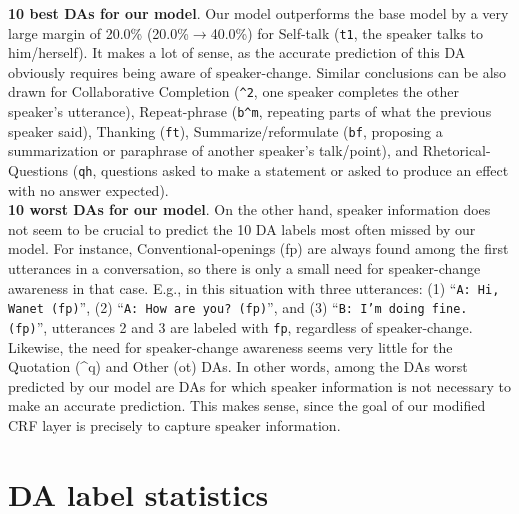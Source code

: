 \documentclass[11pt,a4paper]{article}
\begin{document}
\noindent \textbf{10 best DAs for our model}.
Our model outperforms the base model by a very large margin of 20.0\% (20.0\%$\rightarrow$40.0\%) for Self-talk (\texttt{t1}, the speaker talks to him/herself).
It makes a lot of sense, as the accurate prediction of this DA obviously requires being aware of speaker-change.
Similar conclusions can be also drawn for Collaborative Completion (\texttt{\^{}2}, one speaker completes the other speaker's utterance), Repeat-phrase (\texttt{b\^{}m}, repeating parts of what the previous speaker said), Thanking (\texttt{ft}), Summarize/reformulate (\texttt{bf}, proposing a summarization or paraphrase of another speaker's talk/point), and Rhetorical-Questions (\texttt{qh}, questions asked to make a statement or asked to produce an effect with no answer expected).\\

\noindent \textbf{10 worst DAs for our model}.
On the other hand, speaker information does not seem to be crucial to predict the 10 DA labels most often missed by our model.
For instance, Conventional-openings (fp) are always found among the first utterances in a conversation, so there is only a small need for speaker-change awareness in that case.
E.g., in this situation with three utterances: (1) ``{\small \texttt{A: Hi, Wanet (fp)}}'', (2) ``{\small \texttt{A: How are you? (fp)}}'', and (3) ``{\small \texttt{B: I'm doing fine. (fp)}}'', utterances 2 and 3 are labeled with \texttt{fp}, regardless of speaker-change.
Likewise, the need for speaker-change awareness seems very little for the Quotation (\^{}q) and Other (ot) DAs.
In other words, among the DAs worst predicted by our model are DAs for which speaker information is not necessary to make an accurate prediction.
This makes sense, since the goal of our modified CRF layer is precisely to capture speaker information.

\section{DA label statistics}\label{app:da_label_statistics}
\end{document}
